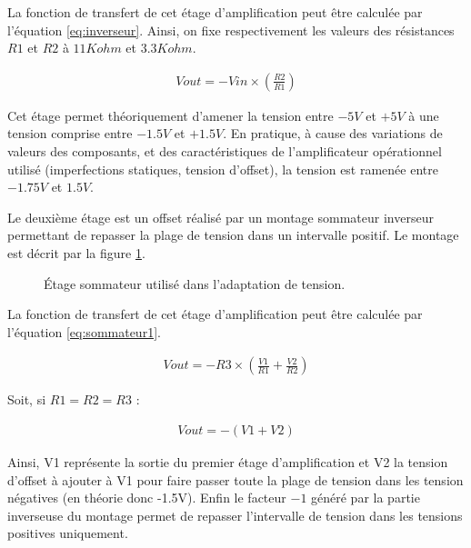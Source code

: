 \documentclass[letterpaper, twoside, 12pt, memoire, creativecommons, hyperref]{thETS}
\begin{document}
La fonction de transfert de cet étage d'amplification peut être calculée par l'équation \ref{eq:inverseur}. Ainsi, on fixe respectivement les valeurs des résistances $R1$ et $R2$ à $11Kohm$ et $3.3Kohm$.

\begin{align}\label{eq:inverseur}
   Vout = -Vin \times ( \frac{R2}{R1} )
\end{align}

Cet étage permet théoriquement d'amener la tension entre $-5V$ et $+5V$ à une tension comprise entre $-1.5V$ et $+1.5V$. En pratique, à cause des variations de valeurs des composants, et des caractéristiques de l'amplificateur opérationnel utilisé (imperfections statiques, tension d'offset), la tension est ramenée entre $-1.75V$ et $1.5V$.

Le deuxième étage est un offset réalisé par un montage sommateur inverseur permettant de repasser la plage de tension dans un intervalle positif. Le montage est décrit par la figure \ref{fig:sommateur1}. 

\begin{figure}
	\centering
	\caption{Étage sommateur utilisé dans l'adaptation de tension.}
	\label{fig:sommateur1}
\end{figure}

La fonction de transfert de cet étage d'amplification peut être calculée par l'équation \ref{eq:sommateur1}. 

\begin{align}\label{eq:sommateur1}
   Vout = -R3 \times ( \frac{V1}{R1} + \frac{V2}{R2})
\end{align}

Soit, si $R1 = R2 = R3$ : 

\begin{align}\label{eq:sommateur2}
   Vout = -(V1 + V2)
\end{align}

Ainsi, V1 représente la sortie du premier étage d'amplification et V2 la tension d'offset à ajouter à V1 pour faire passer toute la plage de tension dans les tension négatives (en théorie donc -1.5V). Enfin le facteur $-1$ généré par la partie inverseuse du montage permet de repasser l'intervalle de tension dans les tensions positives uniquement.
\end{document}
